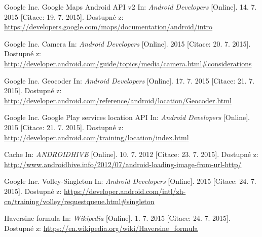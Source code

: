 \documentclass[12pt]{article}
\begin{document}
\begin{thebibliography}{1}
 Google Inc. Google Maps Android API v2 In: \emph{Android Developers}
[Online]. 14. 7. 2015 [Citace: 19. 7. 2015]. Dostupné z: \url{https://developers.google.com/maps/documentation/android/intro}

 Google Inc. Camera In: \emph{Android Developers}
[Online]. 2015 [Citace: 20. 7. 2015]. Dostupné z: \url{http://developer.android.com/guide/topics/media/camera.html#considerations}

 Google Inc. Geocoder In: \emph{Android Developers}
[Online]. 17. 7. 2015 [Citace: 21. 7. 2015]. Dostupné z: \url{http://developer.android.com/reference/android/location/Geocoder.html}

 Google Inc. Google Play services location API In: \emph{Android Developers}
[Online]. 2015 [Citace: 21. 7. 2015]. Dostupné z: \url{http://developer.android.com/training/location/index.html}

 Cache In: \emph{ANDROIDHIVE}
[Online]. 10. 7. 2012 [Citace: 23. 7. 2015]. Dostupné z: \url{http://www.androidhive.info/2012/07/android-loading-image-from-url-http/}

 Google Inc. Volley-Singleton In: \emph{Android Developers}
[Online]. 2015 [Citace: 24. 7. 2015]. Dostupné z:
\url{https://developer.android.com/intl/zh-cn/training/volley/requestqueue.html#singleton}

 Haversine formula In: \emph{Wikipedia}
[Online]. 1. 7. 2015 [Citace: 24. 7. 2015]. Dostupné z:
\url{https://en.wikipedia.org/wiki/Haversine_formula}

\end{thebibliography}
\end{document}
